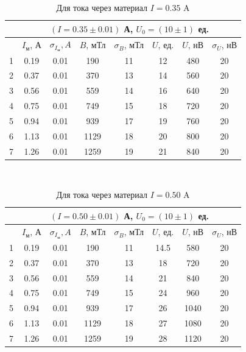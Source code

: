 \documentclass[a4paper,12pt]{article}
\theoremstyle{definition}
\begin{document}
    \begin{table}[H]
      \centering
      \caption{Для тока через материал $I = 0.35$ A}
      \label{tabular:med2}
        \begin{tabular}{|c|c|c|c|c|c|c|c|} \hline
            & \multicolumn{7}{c|}{$(I = 0.35 \pm 0.01)$ А, \qquad $U_0 = (10 \pm 1)$ ед.} \\ \hline
            & $I_{\text{м}}$, А & $\sigma_{I_{\text{м}}}, A$ & $B$, мТл & $\sigma_B$, мТл & $U$, ед. & $U$, нВ & $\sigma_{U}$, нВ \\ \hline
          1 & 0.19 & 0.01 &  190 & 11 & 12 & 480 & 20 \\ \hline
          2 & 0.37 & 0.01 &  370 & 13 & 14 & 560 & 20 \\ \hline
          3 & 0.56 & 0.01 &  559 & 14 & 16 & 640 & 20 \\ \hline
          4 & 0.75 & 0.01 &  749 & 15 & 18 & 720 & 20 \\ \hline
          5 & 0.94 & 0.01 &  939 & 17 & 19 & 760 & 20 \\ \hline
          6 & 1.13 & 0.01 & 1129 & 18 & 20 & 800 & 20 \\ \hline
          7 & 1.26 & 0.01 & 1259 & 19 & 21 & 840 & 20 \\ \hline
        \end{tabular}\\
    \end{table}

    \begin{table}[H]
      \centering
      \caption{Для тока через материал $I = 0.50$ A}
      \label{tabular:med3}
        \begin{tabular}{|c|c|c|c|c|c|c|c|} \hline
            & \multicolumn{7}{c|}{$(I = 0.50 \pm 0.01)$ А, \qquad $U_0 = (10 \pm 1)$ ед.} \\ \hline
            & $I_{\text{м}}$, А & $\sigma_{I_{\text{м}}}, A$ & $B$, мТл & $\sigma_B$, мТл & $U$, ед. & $U$, нВ & $\sigma_{U}$, нВ \\ \hline
          1 & 0.19 & 0.01 &  190 & 11 & 14.5 & 580 & 20 \\ \hline
          2 & 0.37 & 0.01 &  370 & 13 & 18 & 720 & 20 \\ \hline
          3 & 0.56 & 0.01 &  559 & 14 & 21 & 840 & 20 \\ \hline
          4 & 0.75 & 0.01 &  749 & 15 & 24 & 960 & 20 \\ \hline
          5 & 0.94 & 0.01 &  939 & 17 & 26 & 1040 & 20 \\ \hline
          6 & 1.13 & 0.01 & 1129 & 18 & 27 & 1080 & 20 \\ \hline
          7 & 1.26 & 0.01 & 1259 & 19 & 28 & 1120 & 20 \\ \hline
        \end{tabular}\\
    \end{table}
\end{document}
